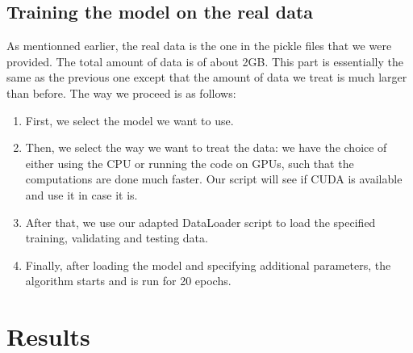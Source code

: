 \documentclass[10pt,conference]{IEEEtran}
\begin{document}
\subsection{Training the model on the real data}
As mentionned earlier, the real data is the one in the pickle files that we were provided. The total amount of data is of about 2GB. This part is essentially the same as the previous one except that the amount of data we treat is much larger than before. The way we proceed is as follows:
\begin{enumerate}
  \item First, we select the model we want to use.
  \item Then, we select the way we want to treat the data: we have the choice of either using the CPU or running the code on GPUs, such that the computations are done much faster. Our script will see if CUDA is available and use it in case it is.
  \item After that, we use our adapted DataLoader script to load the specified training, validating and testing data.
  \item Finally, after loading the model and specifying additional parameters, the algorithm starts and is run for 20 epochs.
\end{enumerate}

\section{Results}
\end{document}
